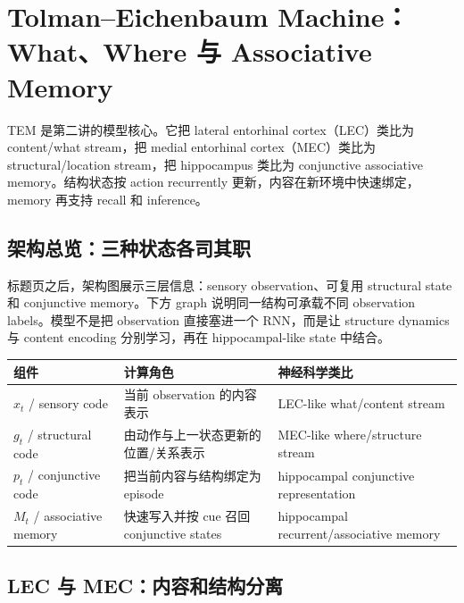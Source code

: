 \section{Tolman--Eichenbaum Machine：What、Where 与 Associative Memory}

TEM 是第二讲的模型核心。它把 lateral entorhinal cortex（LEC）类比为 content/what stream，把 medial entorhinal cortex（MEC）类比为 structural/location stream，把 hippocampus 类比为 conjunctive associative memory。结构状态按 action recurrently 更新，内容在新环境中快速绑定，memory 再支持 recall 和 inference。

\subsection{架构总览：三种状态各司其职}

标题页之后，架构图展示三层信息：sensory observation、可复用 structural state 和 conjunctive memory。下方 graph 说明同一结构可承载不同 observation labels。模型不是把 observation 直接塞进一个 RNN，而是让 structure dynamics 与 content encoding 分别学习，再在 hippocampal-like state 中结合。



\begin{longtable}{@{}L{0.17\textwidth}L{0.31\textwidth}L{0.40\textwidth}@{}}
\toprule
组件 & 计算角色 & 神经科学类比 \\
\midrule
$x_t$ / sensory code & 当前 observation 的内容表示 & LEC-like what/content stream \\
$g_t$ / structural code & 由动作与上一状态更新的位置/关系表示 & MEC-like where/structure stream \\
$p_t$ / conjunctive code & 把当前内容与结构绑定为 episode & hippocampal conjunctive representation \\
$M_t$ / associative memory & 快速写入并按 cue 召回 conjunctive states & hippocampal recurrent/associative memory \\
\bottomrule
\end{longtable}

\subsection{LEC 与 MEC：内容和结构分离}

